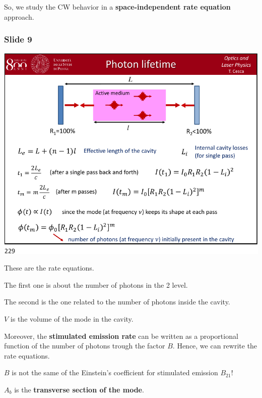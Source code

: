\documentclass[../main/main.tex]{subfiles}
\begin{document}
So, we study the CW behavior in a \textbf{space-independent rate equation} approach.
\subsubsection*{Slide 9}

\begin{minipage}[]{0.5\linewidth}
\centering
\includegraphics[page=9,width=1\textwidth]{../lessons/pdf_file/12_lecture.pdf}
\end{minipage}
\hspace{0.3cm}\vspace{0.3cm}
\begin{minipage}[c]{0.47\linewidth}

These are the rate equations.

The first one is about the number of photons in the 2 level.

The second is the one related to the number of photons inside the cavity.

\( V \) is the volume of the mode in the cavity.

Moreover, the \textbf{stimulated emission rate} can be written as a proportional function of the number of photons trough the factor \( B \).
Hence, we can rewrite the rate equations.

\( B \) is not the same of the Einstein's coefficient for stimulated emission \( B_{21} \)!

\( A_b \) is the \textbf{transverse section of the mode}.

\end{minipage}
\end{document}
